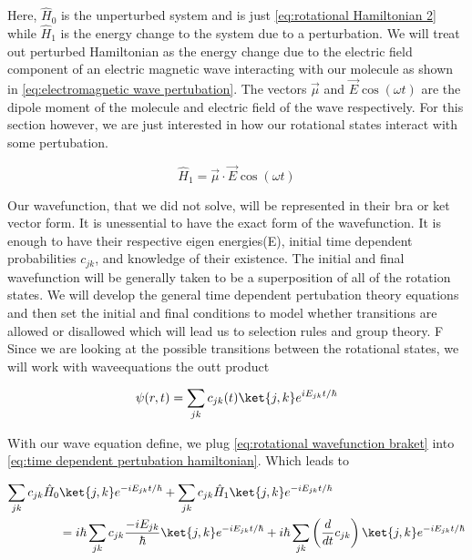 \documentclass[11pt,a4paper]{book}
\begin{document}
			Here, $\hat{H}_0$ is the unperturbed system and is just \autoref{eq:rotational Hamiltonian 2} while $\hat{H}_1$ is the energy change to the system due to a perturbation. We will treat out perturbed Hamiltonian as the energy change due to the electric field component of an electric magnetic wave interacting with our molecule as shown in \autoref{eq:electromagnetic wave pertubation}. The vectors $\vec{\mu}$ and $\vec{E}\cos{(\omega t)}$ are the dipole moment of the molecule and electric field of the wave respectively. For this section however, we are just interested in how our rotational states interact with some pertubation.
			
			\begin{equation}
				\label{eq:electromagnetic wave pertubation}
				\hat{H}_1 = \vec{\mu}\cdot \vec{E} \cos{(\omega t)}
			\end{equation}
			
			Our wavefunction, that we did not solve, will be represented in their bra or ket vector form. It is unessential to have the exact form of the wavefunction. It is enough to have their respective eigen energies(E), initial time dependent probabilities $c_{jk}$, and knowledge of their existence. The initial and final wavefunction will be generally taken to be a superposition of all of the rotation states. We will develop the general time dependent pertubation theory equations and then set the initial and final conditions to model whether transitions are allowed or disallowed which will lead us to selection rules and group theory. 
			F
			Since we are looking at the possible transitions between the rotational states, we will work with waveequations the outt product
			
			\begin{equation}
				\label{eq:rotational wavefunction braket}
				\psi(r,t)=\sum_{jk} c_{jk}(t) \ket{j,k} e^{iE_{jk}t/\hbar}
			\end{equation}
			
			With our wave equation define, we plug \autoref{eq:rotational wavefunction braket} into \autoref{eq:time dependent pertubation hamiltonian}. Which leads to 
			
			\begin{equation}
				\begin{split}
					\label{eq:time dependent pertubation theory}
					\sum_{jk} c_{jk}\hat{H}_0 &\ket{ j, k}e^{-i E_{jk} t/ \hbar} + 
					\sum_{jk} c_{jk}\hat{H}_1\ket{j, k} e^{-i E_{j k} t/ \hbar} \\
					& =
					i\hbar \sum_{jk} {c}_{jk} \dfrac{-i E_{j k}}{\hbar}\ket{j, k}e^{-i E_{jk} t/ \hbar} +
					i\hbar \sum_{jk} \left(\dfrac{d}{dt}{c}_{jk} \right)  \ket{j, k}e^{-i E_{jk} t/ \hbar}
				\end{split}
			\end{equation}
			
\end{document}
